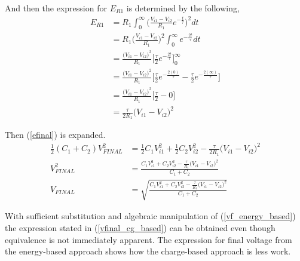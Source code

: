 \documentclass[12pt,letterpaper]{report}
\begin{document}
	And then the expression for $E_{R1}$ is determined by the following,
	\begin{align}
		E_{R1} &= R_1 \int_{0}^{\infty} \bigg( \frac{V_{i1} - V_{i2}}{R_1}  e^{-\frac{t}{\tau}}  \bigg)^2 dt \nonumber \\
		&=R_1 \bigg( \frac{V_{i1} - V_{i2}}{R_1}  \bigg)^2 \int_{0}^{\infty}    e^{-\frac{2t}{\tau}}  dt \nonumber \\
		&=  \frac{\big(V_{i1} - V_{i2}\big)^2}{R_1}  \bigg[ \frac{\tau}{2} e^{-\frac{2t}{\tau}} \bigg]_{0}^{\infty} \nonumber\\
		&=  \frac{\big(V_{i1} - V_{i2}\big)^2}{R_1}  \bigg[ \frac{\tau}{2} e^{-\frac{2(0)}{\tau}} - \frac{\tau}{2} e^{-\frac{2(\infty)}{\tau}} \bigg] \nonumber \\
		&=  \frac{\big(V_{i1} - V_{i2}\big)^2}{R_1}  \bigg[ \frac{\tau}{2}  - 0 \bigg] \nonumber \\
		&= \frac{\tau}{2R_1} \big(V_{i1} - V_{i2}\big)^2
	\end{align}
	
	Then (\ref{efinal}) is expanded.
	\begin{align}
		\frac{1}{2} (C_1+C_2)V_{FINAL}^2 &= \frac{1}{2}C_1V_{i1}^2 +\frac{1}{2}C_2V_{i2}^2 - \frac{\tau}{2R_1} \big(V_{i1} - V_{i2}\big)^2 \nonumber \\
		V_{FINAL}^2 &= \frac{C_1V_{i1}^2 +C_2V_{i2}^2 - \frac{\tau}{R_1} \big(V_{i1} - V_{i2}\big)^2}{C_1+C_2} \nonumber \\
		V_{FINAL} &= \sqrt{\frac{C_1V_{i1}^2 +C_2V_{i2}^2 - \frac{\tau}{R_1} \big(V_{i1} - V_{i2}\big)^2}{C_1+C_2}} \label{vf_energy_based}
	\end{align}
	
	With sufficient substitution and algebraic manipulation of (\ref{vf_energy_based}) the expression stated in (\ref{vfinal_cg_based}) can be obtained even though equivalence is not immediately apparent.  The expression for final voltage from the energy-based approach shows how the charge-based approach is less work.
\end{document}

